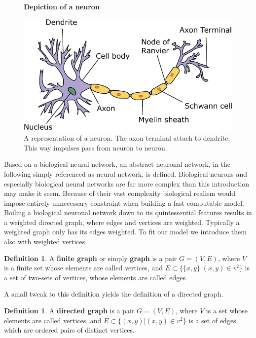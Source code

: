 \documentclass{article}
\theoremstyle{definition}
\newtheorem{definition}[theorem]{Definition}
\newcommand*{\figuretitle}[1]{%
    {\centering%
    \textbf{#1}%
    \par\medskip}%
}
\begin{document}
\begin{figure}[H]
\centering
\figuretitle{Depiction of a neuron}
\includegraphics[scale=0.75]{graphics/neuron.pdf}
\caption{A representation of a neuron. The axon terminal attach to dendrite. This way impulses pass from neuron to neuron\cite{neuron2020}.}
\label{fig:neuron}
\end{figure}

Based on a biological neural network, an abstract neuronal network, in the following simply referenced as neural network, is defined. Biological neurons and especially biological neural networks are far more complex than this introduction may make it seem. Because of their vast complexity biological realism would impose entirely unnecessary constraint when building a fast computable model. Boiling a biological neuronal network down to its quintessential features results in a weighted directed graph, where edges and vertices are weighted. Typically a weighted graph only has its edges weighted. To fit our model we introduce them also with weighted vertices.

\begin{definition}\hspace{1sp}\cite[p.~148]{bender2010lists}
A \textbf{finite graph} or simply \textbf{graph} is a pair $G = (V, E)$, where $V$ is a finite set whose elements are called vertices, and $E \subset \{ \{x, y\}|(x,y) \in v^{2} \}$ is a set of two-sets of vertices, whose elements are called edges.
\end{definition}

A small tweak to this definition yields the definition of a directed graph.

\begin{definition}
A \textbf{directed graph} is a pair $G = (V, E)$, where $V$ is a set whose elements are called vertices, and $E \subset \{ (x, y)|(x,y) \in v^{2} \}$ is a set of edges which are ordered pairs of distinct vertices.
\end{definition}
\end{document}
